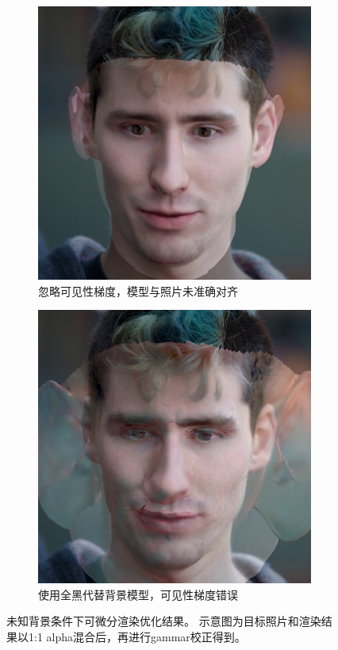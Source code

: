 \begin{figure}
\centering
\begin{subfigure}[t]{0.45\textwidth}
    \centering
    \includegraphics[width=\textwidth]{figures/black-bg_no-aa}
    \caption{忽略可见性梯度，模型与照片未准确对齐}
    \label{fig:problem_a}
\end{subfigure}
\begin{subfigure}[t]{0.45\textwidth}
    \centering
    \includegraphics[width=\textwidth]{figures/black-bg}
    \caption{使用全黑代替背景模型，可见性梯度错误}
    \label{fig:problem_b}
\end{subfigure}
\caption[未知背景条件下可微分渲染优化结果]{
    未知背景条件下可微分渲染优化结果。
    示意图为目标照片和渲染结果以1:1 alpha混合后，再进行gammar校正得到。
}
\end{figure}

